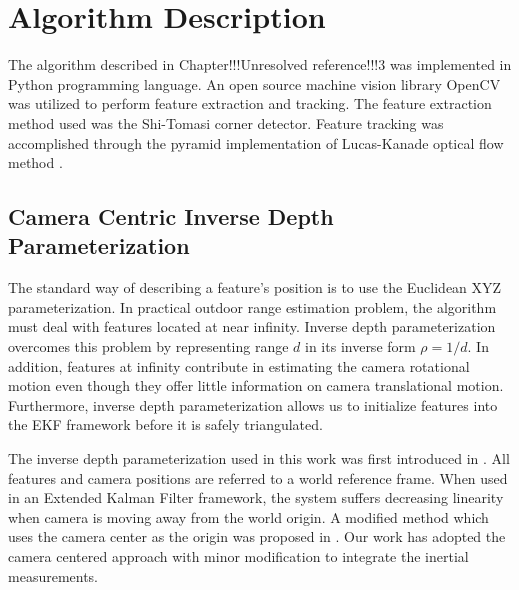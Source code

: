 \chapter{Algorithm Description}

The algorithm described in Chapter!!!Unresolved reference!!!3 was 
implemented in Python programming language. An open source machine 
vision library OpenCV was utilized to perform feature extraction and 
tracking. The feature extraction method used was the Shi-Tomasi corner 
detector. Feature tracking was accomplished through the pyramid 
implementation of Lucas-Kanade optical flow method . 

\section{Camera Centric Inverse Depth Parameterization}
The standard way of describing a feature's position is to use the 
Euclidean XYZ parameterization. In practical outdoor range estimation 
problem, the algorithm must deal with features located at near infinity. 
Inverse depth parameterization overcomes this problem by representing 
range $d$ in its inverse form $\rho =1/d$. In addition, features at 
infinity contribute in estimating the camera rotational motion even 
though they offer little information on camera translational motion. 
Furthermore, inverse depth parameterization allows us to initialize 
features into the EKF framework before it is safely triangulated.

The inverse depth parameterization used in this work was first 
introduced in . All features and camera positions are referred to a 
world reference frame. When used in an Extended Kalman Filter framework, 
the system suffers decreasing linearity when camera is moving away from 
the world origin. A modified method which uses the camera center as the 
origin was proposed in . Our work has adopted the camera centered 
approach with minor modification to integrate the inertial measurements.


